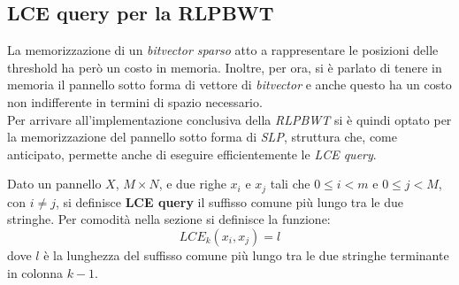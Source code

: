 \subsection{LCE query per la RLPBWT}
La memorizzazione di un \textit{bitvector sparso} atto a rappresentare le
posizioni delle threshold ha però un costo in memoria. Inoltre, per ora, si è
parlato di tenere in memoria il pannello sotto forma di vettore di
\textit{bitvector} e anche questo ha un costo non indifferente in termini di
spazio necessario.\\
Per arrivare all'implementazione conclusiva della \textit{RLPBWT} si è quindi
optato per la memorizzazione del pannello sotto forma di \textit{SLP}, struttura
che, come anticipato, permette anche di eseguire efficientemente le \textit{LCE
  query}.
\begin{definizione}
  Dato un pannello $X$, $M\times N$, e due righe $x_i$ e $x_j$ tali che $0\leq
  i <m$ e $0\leq j <M$, con $i\neq j$, si definisce \textbf{LCE query} il
  suffisso comune più lungo tra le due stringhe. Per comodità nella sezione si
  definisce la funzione: 
  \[LCE_k(x_i,x_j)=l\]
  dove $l$ è la lunghezza del suffisso comune più lungo tra le due stringhe
  terminante in colonna $k-1$.
\end{definizione}
